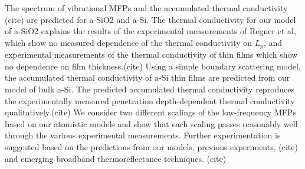 \documentclass[aps,prb,twocolumn,superscriptaddress,footinbib,amsmath,amssymb,floatfix]{revtex4}
\begin{document}
The spectrum of vibrational MFPs and the accumulated thermal conductivity
(cite) 
are predicted for a-SiO2 and a-Si. The thermal conductivity for our model 
of a-SiO2 explains the results of the experimental measurements 
of Regner et al, which show no measured dependence of the thermal 
conductivity on $L_p$,\cite{regner_broadband_2013} and experimental 
measurements of the thermal conductivity of thin films which 
show no dependence on film thickness.(cite) 
Using a simple boundary scattering model, the accumulated thermal 
conductivity of a-Si thin films are predicted from our model 
of bulk a-Si. The predicted accumulated thermal conductivity 
reproduces the experimentally measured penetration depth-dependent 
thermal conductivity qualitatively.(cite) We consider two different 
scalings of the low-frequency MFPs based on our atomistic models 
and show that each scaling passes reasonably well through the 
various experimental measurements.
\cite{liu_high_2009,yang_anomalously_2010} Further experimentation 
is suggested based on the predictions from our models, previous 
experiments,
(cite) 
and emerging broadband thermoreflectance techniques.
(cite)
\end{document}
